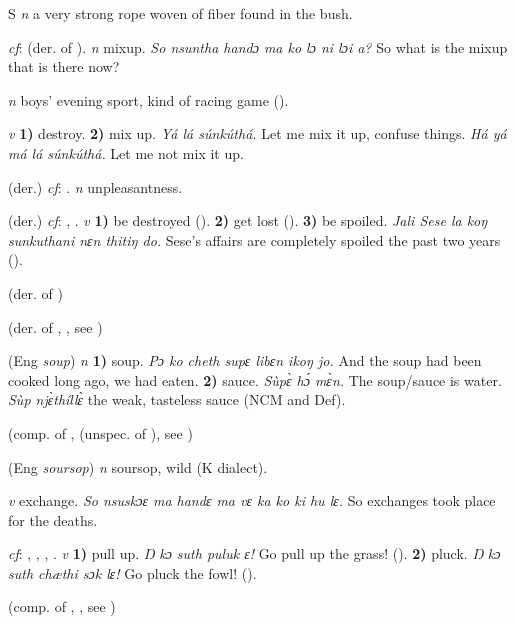 \begin{letter}{S}
 \textit{n} a very strong rope woven of fiber found in the bush.

 \textit{cf}:  (der. of ). \textit{n} mixup. \textit{So nsuntha handɔ ma ko lɔ ni lɔi a?} So what is the mixup that is there now?

 \textit{n} boys' evening sport, kind of racing game (\citealt{Pichl1967}).

 \textit{v} \textbf{1)} destroy. \textbf{2)} mix up. \textit{Yá lá súnkúthá.} Let me mix it up, confuse things. \textit{Há yá má lá súnkúthá.} Let me not mix it up.

 (der.) \textit{cf}: . \textit{n} unpleasantness.

 (der.) \textit{cf}: , . \textit{v} \textbf{1)} be destroyed (\citealt{Pichl1967}). \textbf{2)} get lost (\citealt{Pichl1967}). \textbf{3)} be spoiled. \textit{Jali Sese la koŋ sunkuthani nɛn thitiŋ do.} Sese's affairs are completely spoiled the past two years (\citealt{Pichl1967}). 

 (der. of ) 

 (der. of , , see ) 

 (Eng \textit{soup}) \textit{n} \textbf{1)} soup. \textit{Pɔ ko cheth supɛ libɛn ikoŋ jo.} And the soup had been cooked long ago, we had eaten. \textbf{2)} sauce. \textit{Sùpɛ̀ hɔ́ mɛ̀n.} The soup/sauce is water. \textit{Sùp njɛ̀thíllɛ̀} the weak, tasteless sauce (NCM and Def).

 (comp. of ,  (unspec. of ), see ) 

 (Eng \textit{soursop}) \textit{n} soursop, wild (K dialect).

 \textit{v} exchange. \textit{So nsuskɔɛ ma handɛ ma vɛ ka ko ki hu lɛ.} So exchanges took place for the deaths.

 \textit{cf}: , , , . \textit{v} \textbf{1)} pull up. \textit{Ŋ kɔ suth puluk ɛ!} Go pull up the grass! (\citealt{Pichl1967}). \textbf{2)} pluck. \textit{Ŋ kɔ suth chæthi sɔk lɛ!} Go pluck the fowl! (\citealt{Pichl1967}).

 (comp. of , , see ) 


\end{letter}

